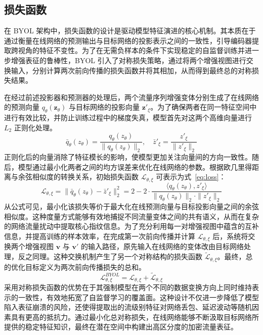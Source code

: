 \subsection{损失函数}
在 BYOL 架构中，损失函数的设计是驱动模型特征演进的核心机制。其本质在于通过衡量在线网络的预测输出与目标网络的投影表示之间的一致性，引导编码器提取跨视角的特征不变性。为了在无需负样本的条件下实现稳定的自监督训练并进一步增强表征的鲁棒性，BYOL 引入了对称损失策略，通过将两个增强视图进行交换输入，分别计算两次前向传播的损失函数并将其相加，从而得到最终总的对称损失结果。

在经过前述投影器和预测器的处理后，两个流量序列增强变体分别生成了在线网络的预测向量 $q_\theta(\mathbf{z}_\theta)$ 与目标网络的投影向量 $\mathbf{z}'_\xi$。为了确保两者在同一特征空间中进行有效比较，并防止训练过程中的梯度失真，模型首先对这两个高维向量进行 $L_2$ 正则化处理。
\begin{equation}
  \bar{q}_{\theta}(z_{\theta}) = \frac{q_{\theta}(z_{\theta})}{\| q_{\theta}(z_{\theta}) \|_2}, \quad \bar{z}'_{\xi} = \frac{z'_{\xi}}{\| z'_{\xi} \|_2}
  \label{eq:L2}
\end{equation}
正则化后的向量消除了特征模长的影响，使模型更加关注向量间的方向一致性。随后，模型通过最小化两者之间的均方误差来优化在线网络的参数。根据欧几里得距离与余弦相似度的转换关系，初始损失函数 $\mathcal{L}_{\theta,\xi}$ 可表示为式~\ref{eq:loss}：
\begin{equation}
  \mathcal{L}_{\theta,\xi} = \| \bar{q}_\theta(z_\theta) - \bar{z}'_\xi \|_2^2 = 2 - 2 \cdot \frac{\langle q_\theta(z_\theta), z'_\xi \rangle}{\| q_\theta(z_\theta) \|_2 \cdot \| z'_\xi \|_2}
  \label{eq:loss}
\end{equation}
从公式可见，最小化该损失等价于最大化在线预测向量与目标投影向量之间的余弦相似度。这种度量方式能够有效地捕捉不同流量变体之间的共有语义，从而在复杂的网络流量扰动中提取核心指纹信息。为了充分利用每一对增强视图中蕴含的互补信息，并提高训练的样本效率，在完成第一次前向传播并计算 $\mathcal{L}_{\theta,\xi}$ 后，系统将交换两个增强视图 $\mathbf{v}$ 与 $\mathbf{v}'$ 的输入路径，原先输入在线网络的变体改由目标网络处理，反之同理。这种交换机制产生了另一个对称结构的损失函数 $\tilde{\mathcal{L}}_{\theta,\xi}$。最终，总的优化目标定义为两次前向传播损失的总和。
\begin{equation}
  \mathcal{L}_{\theta,\xi}^{BYOL} = \mathcal{L}_{\theta,\xi} + \tilde{\mathcal{L}}_{\theta,\xi}
  \label{eq:allloss}
\end{equation}
采用对称损失函数的优势在于其强制模型在两个不同的数据变换方向上同时维持表示的一致性，有效地拓宽了自监督学习的覆盖面。这种设计不仅进一步降低了模型陷入表征崩溃的风险，还使得提取出的流级别特征对网络丢包、延迟波动等随机因素具有更高的抵抗力。通过最小化总对称损失，在线网络能够不断汲取目标网络所提供的稳定特征知识，最终在潜在空间中构建出高区分度的加密流量表征。

